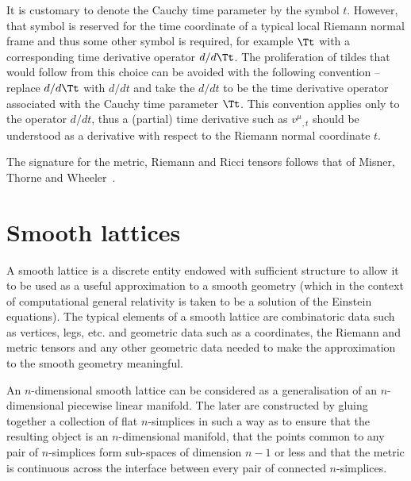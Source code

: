 \documentclass[a4paper,12pt]{article}
\numberwithin{equation}{section}
\begin{document}
It is customary to denote the Cauchy time parameter by the symbol $t$. However, that
symbol is reserved for the time coordinate of a typical local Riemann normal frame and
thus some other symbol is required, for example $\Tt$ with a corresponding time
derivative operator $d/d\Tt$. The proliferation of tildes that would follow from this
choice can be avoided with the following convention -- replace $d/d\Tt$ with $d/dt$ and
take the $d/dt$ to be the time derivative operator associated with the Cauchy time
parameter $\Tt$. This convention applies only to the operator $d/dt$, thus a (partial)
time derivative such as $v^\mu{}_{,t}$ should be understood as a derivative with respect
to the Riemann normal coordinate $t$.

The signature for the metric, Riemann and Ricci tensors follows that of Misner, Thorne
and Wheeler~\cite{mtw:1973-01}.

\section{Smooth lattices}
\label{sec:SmoothLattices}

A smooth lattice is a discrete entity endowed with sufficient structure to allow it to be
used as a useful approximation to a smooth geometry (which in the context of computational
general relativity is taken to be a solution of the Einstein equations). The typical
elements of a smooth lattice are combinatoric data such as vertices, legs, etc. and
geometric data such as a coordinates, the Riemann and metric tensors and any other geometric
data needed to make the approximation to the smooth geometry meaningful.


An $n$-dimensional smooth lattice can be considered as a generalisation of an
$n$-dimensional piecewise linear manifold. The later are constructed by gluing together a
collection of flat $n$-simplices in such a way as to ensure that the resulting object is an
$n$-dimensional manifold, that the points common to any pair of $n$-simplices form
sub-spaces of dimension $n-1$ or less and that the metric is continuous across the interface
between every pair of connected $n$-simplices.
\end{document}
